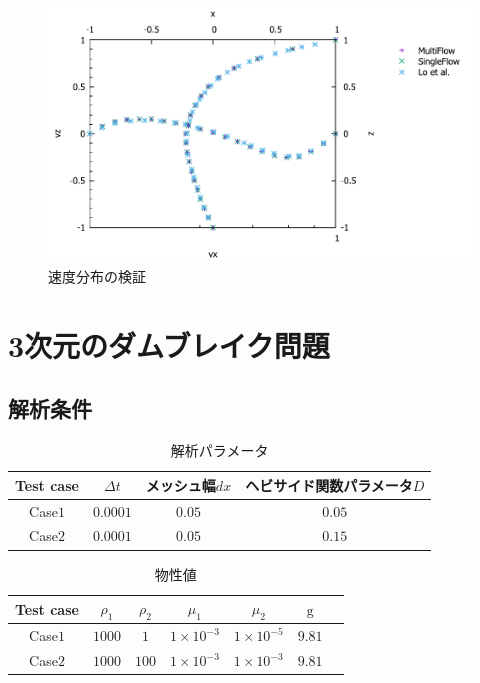 \documentclass[8pt,a4paper]{article}
\begin{document}
\begin{figure}[htbp]
	\centering
	\includegraphics[width=18truecm]{pics/3d-cavity/velocity_graph.pdf}
	\caption{速度分布の検証}
	\label{fig:3d-bubble-levelset_t0-3}
\end{figure}

\newpage
\section{3次元のダムブレイク問題}
\subsection{解析条件}

\renewcommand{\arraystretch}{1}
\begin{table}[H]
	\centering
	\caption{解析パラメータ}
	\begin{tabular}{cccc}
		\hline
		Test case & $\Delta t$ & メッシュ幅$dx$ & ヘビサイド関数パラメータ$D$\\
		\hline 
		Case$1$ & $0.0001$ & $0.05$ & $0.05$\\
		Case$2$ & $0.0001$ & $0.05$ & $0.15$\\
		\hline         
	\end{tabular}
	\label{table:mars-env}
\end{table}
\renewcommand{\arraystretch}{1.0}

\renewcommand{\arraystretch}{1}
\begin{table}[H]
	\centering
	\caption{物性値}
	\begin{tabular}{ccccccc}
		\hline
		Test case & $\rho_1$ & $\rho_2$ & $\mu_1$ & $\mu_2$ & $\mathrm{g}$ \\
		\hline 
		Case$1$ & $1000$ & $1$   & $1\times10^{-3}$ & $1\times10^{-5}$ & $9.81$ \\
		Case$2$ & $1000$ & $100$ & $1\times10^{-3}$ & $1\times10^{-3}$ & $9.81$ \\
		\hline         
	\end{tabular}
	\label{table:mars-env}
\end{table}
\renewcommand{\arraystretch}{1.0}
\end{document}
